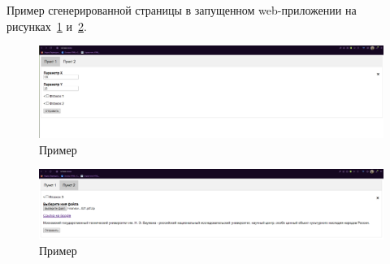 Пример сгенерированной страницы в запущенном web-приложении на рисунках~\ref{rndhpcgui.2023.03.30.picture1} и~\ref{rndhpcgui.2023.03.30.picture2}.
\begin{figure}[!ht]
  \centering
  \includegraphics[scale=0.4]{ResearchNotes/rndhpc_dev_gui_2023_03_30/rndhpcgui.2023.03.30.picture1.png}
  \caption{Пример}
  \label{rndhpcgui.2023.03.30.picture1}
\end{figure}

\begin{figure}[!ht]
    \centering
    \includegraphics[scale=0.4]{ResearchNotes/rndhpc_dev_gui_2023_03_30/rndhpcgui.2023.03.30.picture2.png}
    \caption{Пример}
    \label{rndhpcgui.2023.03.30.picture2}
  \end{figure}
\noteattributes{}

